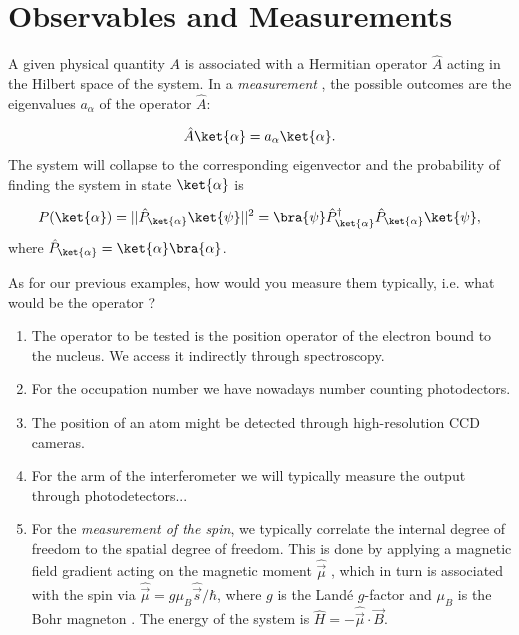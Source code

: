 \section{Observables and Measurements}

A given physical quantity $A$ is associated with a Hermitian operator $\hat{A}$  acting in the Hilbert space  of the system.
In a \emph{measurement} , the possible outcomes are the eigenvalues $a_\alpha$  of the operator $\hat{A}$:

\begin{align}
				\hat{A}\ket{\alpha}=a_{\alpha}\ket{\alpha}.
			
\end{align}
The system will collapse to the corresponding eigenvector  and the probability of finding the system in state $\ket{\alpha}$ is

\begin{align}
	P(\ket{\alpha})=||\hat{P}_{\ket{\alpha}} \ket{\psi}||^2 = \bra{\psi} \hat{P}^{\dag}_{\ket{\alpha}} \hat{P}_{\ket{\alpha}} \ket{\psi},
\end{align}
where $\hat{P}_{\ket{\alpha}}= \ket{\alpha} \bra{\alpha}$.

As for our previous examples, how would you measure them typically, i.e. what would be the operator ?
\begin{enumerate}
\item The operator to be tested is the position operator of the electron bound to the nucleus. We access it indirectly through spectroscopy.
\item For the occupation number we have nowadays number counting photodectors.
\item The position of an atom might be detected through high-resolution CCD cameras.
\item For the arm of the interferometer we will typically measure the output through photodetectors...
\item For the \textit{measurement of the spin}, we typically correlate the internal degree of freedom to the spatial degree of freedom. This is done by applying a magnetic field gradient acting on the magnetic moment $\hat{\vec{\mu}}$ , which in turn is associated with the spin via $\hat{\vec{\mu}} = g \mu_B \hat{\vec{s}}/\hbar$, where $g$ is the Landé $g$-factor  and $\mu_B$ is the Bohr magneton . The energy of the system is $\hat{H} = -\hat{\vec{\mu}} \cdot \vec{B}$.
\end{enumerate}